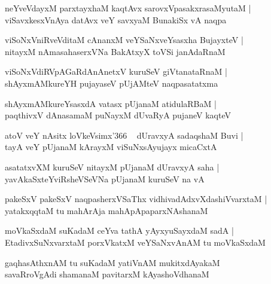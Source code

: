 \documentclass[twoside,12pt,openright]{book}
\newcounter{shloka}[chapter]
\begin{document}
\begin{shloka}%
neYveVdayxM parxtayxhaM kaqtAvx sarovxVpasakxrasaMyutaM |\\
viSavxkesxVnAya datAvx veY savxyaM BunakiSx vA naqpa
\end{shloka}

\begin{shloka}%
viSoNxVniRveVditaM cAnanxM veYSaNxveYsasxha BujayxteV |\\
nitayxM nAmasahaserxVNa BakAtxyX toVSi janAdaRnaM 
\end{shloka}

\begin{shloka}%
viSoNxVdiRVpAGaRdAnAnetxV kuruSeV giVtanataRnaM |\\
shAyxmAMkureYH pujayaseV pUjAMteV naqpasatatxma
\end{shloka}

\begin{shloka}%
shAyxmAMkureYsasxdA vatasx pUjanaM atidulaRBaM |\\
paqthivxV dAnasamaM puNayxM dUvaRyA pujaneV kaqteV 
\end{shloka}

\begin{shloka}%
atoV veY nAsitx loVkeVsimx\char'366 ~ dUravxyA sadaqshaM Buvi |\\
tayA veY pUjanaM kArayxM viSuNxsAyujayx micaCxtA
\end{shloka}

\begin{shloka}%
asatatxvXM kuruSeV nitayxM pUjanaM dUravxyA saha |\\
yavAkaSxteYviRsheVSeVNa pUjanaM kuruSeV na vA 
\end{shloka}

\begin{shloka}%
pakeSxV pakeSxV naqpasherxVSaThx vidhivadAdxvXdashiVvarxtaM |\\
yatakxqqtaM tu mahArAja mahApApaparxNAshanaM 
\end{shloka}

\begin{shloka}%
moVkaSxdaM suKadaM ceYva tathA yAyxyuSayxdaM sadA |\\
EtadivxSuNxvarxtaM porxVkatxM veYSaNxvAnAM tu moVkaSxdaM 
\end{shloka}

\begin{shloka}%
gaqhasAthxnAM tu suKadaM yatiVnAM mukitxdAyakaM \\
savaRroVgAdi shamanaM pavitarxM kAyashoVdhanaM 
\end{shloka}
\end{document}
